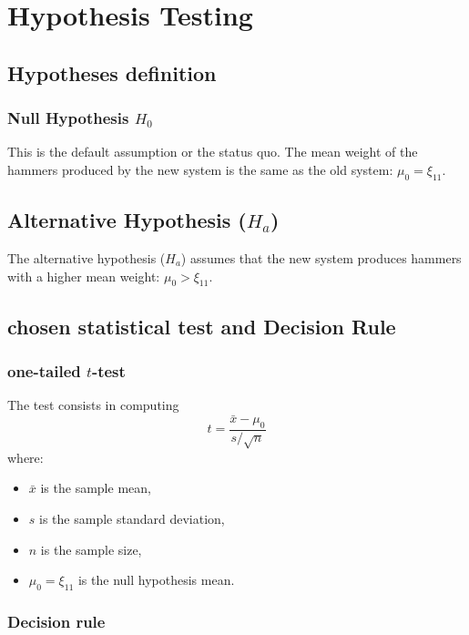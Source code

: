 \section{Hypothesis Testing}

\subsection{Hypotheses definition}

\subsubsection*{Null Hypothesis $H_{0}$}

This is the default assumption or the status quo.  The mean weight of the hammers produced by the new system is the same as the old system: $\mu_{0} = \xi_{11}$.

\subsection*{Alternative Hypothesis ($H_{a}$)}

The alternative hypothesis ($H_{a}$) assumes that the new system produces hammers with a higher mean weight: $\mu_{0} > \xi_{11}$.


\subsection{chosen statistical test and Decision Rule}



\subsubsection*{one-tailed $ t $-test}
The test consists in computing
\begin{equation}
t = \frac{\bar{x} - \mu_0}{s / \sqrt{n}}
\end{equation}
where:
\begin{itemize}
    \item $\bar{x}$ is the sample mean,
    \item $s$ is the sample standard deviation,
    \item $n$ is the sample size,
    \item $\mu_{0} = \xi_{11}$ is the null hypothesis mean.
\end{itemize}

\subsubsection*{Decision rule}

